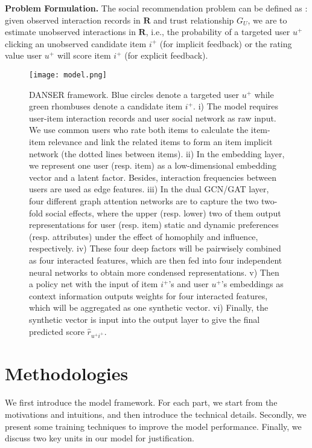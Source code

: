 \documentclass[sigconf]{acmart}
\begin{document}
\textbf{Problem Formulation.} The social recommendation problem can be defined as \cite{review}: given observed interaction records in $\mathbf R$ and trust relationship $G_U$, we are to estimate unobserved interactions in $\mathbf R$, i.e., the probability of a targeted user $u^+$ clicking an unobserved candidate item $i^+$ (for implicit feedback) or the rating value user $u^+$ will score item $i^+$ (for explicit feedback).

\begin{figure*}[h]
	\centering
	\texttt{[image: model.png]}
	\caption{DANSER framework. Blue circles denote a targeted user $u^+$ while green rhombuses denote a candidate item $i^+$.  
	i) The model requires user-item interaction records and user social network as raw input. 
	We use common users who rate both items to calculate the item-item relevance and link the related items to form an item implicit network (the dotted lines between items). 
	ii) In the embedding layer, we represent one user (resp. item) as a low-dimensional embedding vector and a latent factor. Besides, interaction frequencies between users are used as edge features. iii) In the dual GCN/GAT layer, four different graph attention networks are to capture the two two-fold social effects, where the upper (resp. lower) two of them output representations for user (resp. item) static and dynamic preferences (resp. attributes) under the effect of homophily and influence, respectively. 
	iv) These four deep factors will be pairwisely combined as four interacted features, which are then fed into four independent neural networks to obtain more condensed representations. 
	v) Then a policy net with the input of item $i^+$'s and user $u^+$'s embeddings as context information outputs weights for four interacted features, which will be aggregated as one synthetic vector. 
	vi) Finally, the synthetic vector is input into the output layer to give the final predicted score $\hat r_{u^+i^+}$.}
	\label{fig-framework}
	\vspace{-10pt}
\end{figure*}

\section{Methodologies}

We first introduce the model framework. For each part, we start from the motivations and intuitions, and then introduce the technical details.
Secondly, we present some training techniques to improve the model performance. 
Finally, we discuss two key units in our model for justification.
\end{document}
